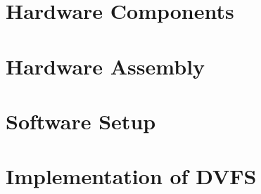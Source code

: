 \section{Hardware Components}

\section{Hardware Assembly}

\section{Software Setup}

\section{Implementation of DVFS}

